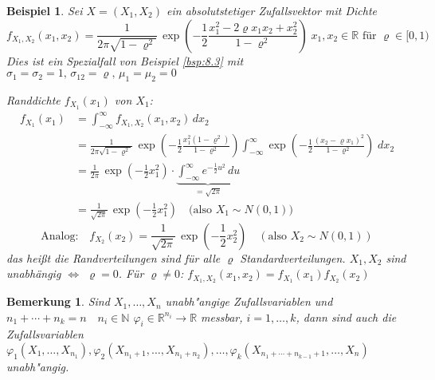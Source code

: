 \documentclass[a4paper,11pt]{book}
\newcommand{\R}{{\mathbb R}}
\newcommand{\N}{{\mathbb N}}
\newtheorem{Bsp}{Beispiel}[chapter]
\newtheorem{Bem}{Bemerkung}[chapter]
\theoremstyle{nonumberplain}
\begin{document}
\begin{Bsp}
Sei $X=(X_1,X_2)$ ein absolutstetiger Zufallsvektor mit Dichte
\[f_{X_1,X_2}(x_1,x_2)=\frac{1}{2\pi\sqrt{1-\varrho^2}}\,\exp\left(-\frac{1}{2}\frac{x_1^2-2\varrho
    x_1x_2+x_2^2}{1-\varrho^2}\right)\; x_1,x_2\in\R 
\text{ für } \varrho\in[0,1)\]
Dies ist ein Spezialfall von Beispiel \ref{bsp:8.3} mit
$\sigma_1=\sigma_2=1,\,\sigma_{12}=\varrho,\,\mu_1=\mu_2=0$

Randdichte $f_{X_1}(x_1)$ von $X_1$:
\begin{align*}
f_{X_1}(x_1) &= \int_{-\infty}^\infty f_{X_1,X_2}(x_1,x_2)\, dx_2 \\
 &=\frac{1}{2\pi\sqrt{1-\varrho^2}}\,\exp\left(-\frac{1}{2}\frac{x_1^2\left(1-\varrho^2\right)}{1-\varrho^2}\right) \int_{-\infty}^\infty \exp\left(-\frac{1}{2}\frac{(x_2-\varrho x_1)^2}{1-\varrho^2}\right)\; dx_2 \\
 &=\frac{1}{2\pi}\, \exp\left(-\frac{1}{2}x_1^2\right) \cdot 
\underbrace{\int_{-\infty}^\infty e^{-\frac{1}{2}u^2}\,du}_{=\sqrt{2\pi}}\\
&=\frac{1}{\sqrt{2\pi}}\, \exp\left(-\frac{1}{2}x_1^2\right)\quad
\bigl(\text{also } X_1\sim N(0,1)\bigr)\end{align*}
\[\text{Analog:}\quad f_{X_2}(x_2)=\frac{1}{\sqrt{2\pi}}\,
\exp\left(-\frac{1}{2}x_2^2\right) \quad (\text{also } X_2\sim N(0,1))\]
das heißt die Randverteilungen sind für alle $\varrho$ Standardverteilungen. $X_1,X_2$ sind unabhängig $\Leftrightarrow$ $\varrho = 0$. Für $\varrho\ne0$: $f_{X_1,X_2}(x_1,x_2) = f_{X_1}(x_1)f_{X_2}(x_2)$
\end{Bsp}

\begin{Bem}
Sind $X_1,\ldots ,X_n$ unabh"angige Zufallsvariablen und $n_1+\cdots +n_k=n \quad n_i\in\N$ $\varphi_i\in\R^{n_i}\rightarrow \R$ messbar, $i=1,\ldots ,k$, dann sind auch die Zufallsvariablen\\
$\varphi_1(X_1,\ldots ,X_{n_1}),\varphi_2(X_{n_1+1},\ldots ,X_{n_1+n_2}),\ldots ,\varphi_k(X_{n_1+\cdots+n_{k-1}+1},\ldots ,X_n)$ unabh"angig. 
\end{Bem}
\end{document}
